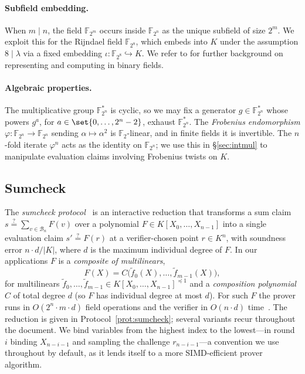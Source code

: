 \documentclass{article}
\theoremstyle{definition}
\newcommand*{\mlin}{{\preceq 1}}
\newcommand*{\mle}{\widetilde}
\newcommand{\BB}{\mathcal{B}}
\newcommand{\FF}[1]{\mathbb{F}_{#1}}
\begin{document}
\paragraph{Subfield embedding.}
When $m \mid n$, the field $\FF{2^m}$ occurs inside $\FF{2^n}$ as the unique subfield of size $2^m$. We exploit this for the Rijndael field $\FF{2^8}$, which embeds into $K$ under the assumption $8 \mid \lambda$ via a fixed embedding $\iota \colon \FF{2^8} \hookrightarrow K$. We refer to \cite{Diamond:2024ab} for further background on representing and computing in binary fields.

\paragraph{Algebraic properties.}
The multiplicative group $\FF{2^n}^*$ is cyclic, so we may fix a generator $g \in \FF{2^n}^*$ whose powers $g^a$, for $a \in \set{0, \ldots, 2^n - 2}$, exhaust $\FF{2^n}^*$. The \emph{Frobenius endomorphism} $\varphi \colon \FF{2^n} \to \FF{2^n}$ sending $\alpha \mapsto \alpha^2$ is $\FF{2}$-linear, and in finite fields it is invertible. The $n$-fold iterate $\varphi^n$ acts as the identity on $\FF{2^n}$; we use this in \S\ref{sec:intmul} to manipulate evaluation claims involving Frobenius twists on $K$.

\subsection{Sumcheck}
\label{sec:sumcheck}

The \emph{sumcheck protocol}~\cite{Lund:1992aa,Thaler:2022aa} is an interactive reduction that transforms a sum claim $s \stackrel{?}{=} \sum_{v \in \BB_n} F(v)$ over a polynomial $F \in K[X_0, \ldots, X_{n - 1}]$ into a single evaluation claim $s' \stackrel{?}{=} F(r)$ at a verifier-chosen point $r \in K^n$, with soundness error $n \cdot d / |K|$, where $d$ is the maximum individual degree of $F$. In our applications $F$ is a \emph{composite of multilinears},
\[
  F(X) = C\bigl(\mle{f}_0(X), \ldots, \mle{f}_{m - 1}(X)\bigr),
\]
for multilinears $\mle{f}_0, \ldots, \mle{f}_{m - 1} \in K[X_0, \ldots, X_{n - 1}]^\mlin$ and a \emph{composition polynomial} $C$ of total degree $d$ (so $F$ has individual degree at most $d$). For such $F$ the prover runs in $O(2^n \cdot m \cdot d)$ field operations and the verifier in $O(n \cdot d)$ time~\cite[\S 3]{Gruen:2024aa}. The reduction is given in Protocol~\ref{prot:sumcheck}; several variants recur throughout the document. We bind variables from the highest index to the lowest---in round $i$ binding $X_{n - i - 1}$ and sampling the challenge $r_{n - i - 1}$---a convention we use throughout by default, as it lends itself to a more SIMD-efficient prover algorithm.
\end{document}
